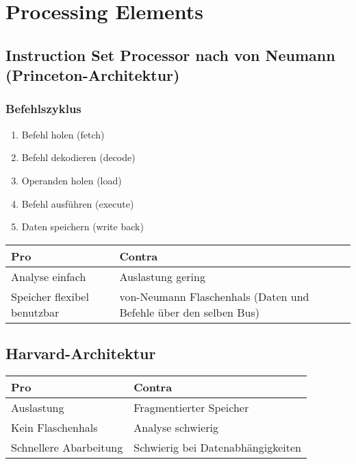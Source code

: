 \chapter{Processing Elements}
\section{Instruction Set Processor nach von Neumann (Princeton-Architektur)}
\subsection{Befehlszyklus}
\begin{enumerate}
    \item Befehl holen (fetch)
    \item Befehl dekodieren (decode)
    \item Operanden holen (load)
    \item Befehl ausführen (execute)
    \item Daten speichern (write back)
\end{enumerate}

\begin{table}[H]
    \centering
    \begin{tabular}{p{}p{}}
        \toprule
        Pro & Contra \\
        \midrule
        Analyse einfach & Auslastung gering \\
        Speicher flexibel benutzbar & von-Neumann Flaschenhals (Daten und Befehle über den selben Bus)\\
        \bottomrule
    \end{tabular}
\end{table}

\section{Harvard-Architektur}
\begin{table}[H]
    \centering
    \begin{tabular}{p{}p{}}
        \toprule
        Pro & Contra \\
        \midrule
        Auslastung & Fragmentierter Speicher \\
        Kein Flaschenhals & Analyse schwierig \\
        Schnellere Abarbeitung & Schwierig bei Datenabhängigkeiten \\
        \bottomrule
    \end{tabular}
\end{table}
